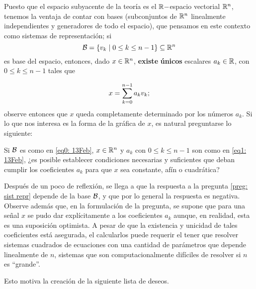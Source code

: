 Puesto que el espacio subyacente de 
la teoría es el $\mathbb{R}-$espacio vectorial 
$\mathbb{R}^{n}$, tenemos la ventaja de contar con
bases (subconjuntos de $\mathbb{R}^{n}$ linealmente
independientes y generadores de todo el espacio),
que pensamos en este contexto como sistemas
de representación; si 
\begin{equation}
\label{eq0: 13Feb}
\mathcal{B}=\{v_{k}
 \hspace{0.1cm} |
\hspace{0.1cm} 0 \leq k \leq n-1 \} 
\subseteq \mathbb{R}^{n}
\end{equation}
es base del espacio, entonces, dado $x \in \mathbb{R}^{n}$, 
\textbf{existe} \textbf{únicos} escalares
$a_{k} \in \mathbb{R}$, con $0 \leq k \leq n-1$
tales que

\begin{equation}
\label{eq1: 13Feb}
x = \sum\limits_{k=0}^{n-1}a_{k}v_{k};
\end{equation}
observe entonces que $x$ 
queda completamente determinado por los
números $a_{k}$. Si lo que nos interesa es
la forma de la gráfica de $x$, es natural preguntarse lo siguiente:

\begin{preg}
\label{preg: sist repr}
Si $\mathcal{B}$ es como en \eqref{eq0: 13Feb}, $x \in \mathbb{R}^{n}$
y $a_{k}$ con $0 \leq k \leq n-1$ son como en 
\eqref{eq1: 13Feb}, ¿es posible establecer condiciones
necesarias y suficientes que deban cumplir los coeficientes
$a_{k}$ para que $x$ sea constante, afín o cuadrática?
\end{preg}

Después de un poco de reflexión, se llega a que la respuesta 
a la pregunta \ref{preg: sist repr} depende de la base
$\mathcal{B}$, y que por lo general la respuesta es negativa.
Observe además que, en la formulación de la pregunta,
se supone que para una señal $x$ se pudo dar
explícitamente a los coeficientes $a_{k}$ aunque,
en realidad,  esta es una suposición optimista.
A pesar de que la existencia y unicidad de tales
coeficientes está asegurada, el calcularlos
puede requerir el tener que resolver sistemas cuadrados
de ecuaciones con una cantidad de parámetros que
depende linealmente de $n$, sistemas que son computacionalmente
difíciles de resolver si $n$ es ``grande''.

Esto motiva la
creación de la siguiente lista de deseos.


